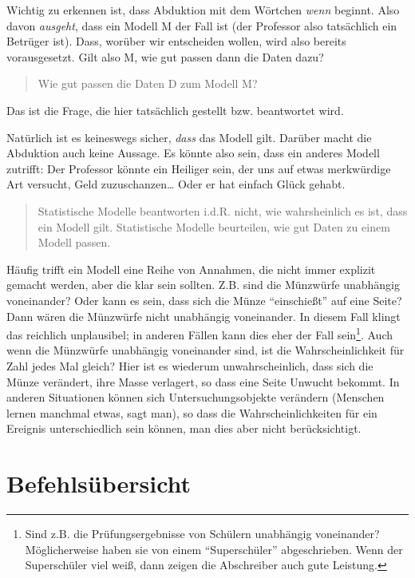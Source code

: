 \documentclass[12pt,ngerman,]{book}
\let\rmarkdownfootnote\footnote%
\def\footnote{\protect\rmarkdownfootnote}
\begin{document}
Wichtig zu erkennen ist, dass Abduktion mit dem Wörtchen \emph{wenn}
beginnt. Also davon \emph{ausgeht}, dass ein Modell M der Fall ist (der
Professor also tatsächlich ein Betrüger ist). Dass, worüber wir
entscheiden wollen, wird also bereits vorausgesetzt. Gilt also M, wie
gut passen dann die Daten dazu?

\begin{quote}
Wie gut passen die Daten D zum Modell M?
\end{quote}

Das ist die Frage, die hier tatsächlich gestellt bzw. beantwortet wird.

Natürlich ist es keineswegs sicher, \emph{dass} das Modell gilt. Darüber
macht die Abduktion auch keine Aussage. Es könnte also sein, dass ein
anderes Modell zutrifft: Der Professor könnte ein Heiliger sein, der uns
auf etwas merkwürdige Art versucht, Geld zuzuschanzen\ldots{} Oder er
hat einfach Glück gehabt.

\begin{quote}
Statistische Modelle beantworten i.d.R. nicht, wie wahrsheinlich es ist,
dass ein Modell gilt. Statistische Modelle beurteilen, wie gut Daten zu
einem Modell passen.
\end{quote}

Häufig trifft ein Modell eine Reihe von Annahmen, die nicht immer
explizit gemacht werden, aber die klar sein sollten. Z.B. sind die
Münzwürfe unabhängig voneinander? Oder kann es sein, dass sich die Münze
``einschießt'' auf eine Seite? Dann wären die Münzwürfe nicht unabhängig
voneinander. In diesem Fall klingt das reichlich unplausibel; in anderen
Fällen kann dies eher der Fall sein\footnote{Sind z.B. die
  Prüfungsergebnisse von Schülern unabhängig voneinander? Möglicherweise
  haben sie von einem ``Superschüler'' abgeschrieben. Wenn der
  Superschüler viel weiß, dann zeigen die Abschreiber auch gute
  Leistung.}. Auch wenn die Münzwürfe unabhängig voneinander sind, ist
die Wahrscheinlichkeit für Zahl jedes Mal gleich? Hier ist es wiederum
unwahrscheinlich, dass sich die Münze verändert, ihre Masse verlagert,
so dass eine Seite Unwucht bekommt. In anderen Situationen können sich
Untersuchungsobjekte verändern (Menschen lernen manchmal etwas, sagt
man), so dass die Wahrscheinlichkeiten für ein Ereignis unterschiedlich
sein können, man dies aber nicht berücksichtigt.

\section{Befehlsübersicht}\label{befehlsubersicht}
\end{document}
